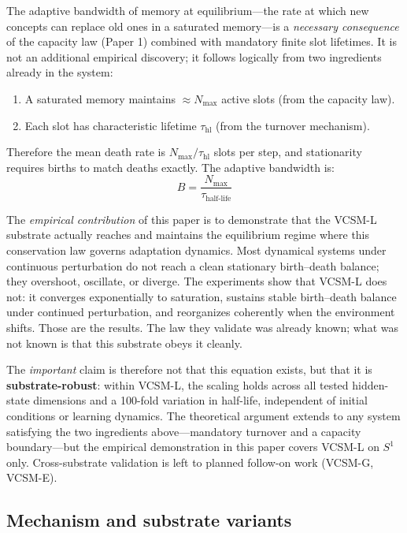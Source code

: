 \documentclass[11pt]{article}
\begin{document}
The adaptive bandwidth of memory at equilibrium---the rate at which new concepts can replace old ones in a saturated memory---is a \emph{necessary consequence} of the capacity law (Paper 1) combined with mandatory finite slot lifetimes. It is not an additional empirical discovery; it follows logically from two ingredients already in the system:
\begin{enumerate}
  \item A saturated memory maintains $\approx N_{\max}$ active slots (from the capacity law).
  \item Each slot has characteristic lifetime $\tau_{\text{hl}}$ (from the turnover mechanism).
\end{enumerate}

Therefore the mean death rate is $N_{\max}/\tau_{\text{hl}}$ slots per step, and stationarity requires births to match deaths exactly. The adaptive bandwidth is:
\[
  B = \frac{N_{\max}}{\tau_{\text{half-life}}}
\]

The \emph{empirical contribution} of this paper is to demonstrate that the VCSM-L substrate actually reaches and maintains the equilibrium regime where this conservation law governs adaptation dynamics. Most dynamical systems under continuous perturbation do not reach a clean stationary birth--death balance; they overshoot, oscillate, or diverge. The experiments show that VCSM-L does not: it converges exponentially to saturation, sustains stable birth--death balance under continued perturbation, and reorganizes coherently when the environment shifts. Those are the results. The law they validate was already known; what was not known is that this substrate obeys it cleanly.

The \emph{important} claim is therefore not that this equation exists, but that it is \textbf{substrate-robust}: within VCSM-L, the scaling holds across all tested hidden-state dimensions and a 100-fold variation in half-life, independent of initial conditions or learning dynamics. The theoretical argument extends to any system satisfying the two ingredients above---mandatory turnover and a capacity boundary---but the empirical demonstration in this paper covers VCSM-L on $S^1$ only. Cross-substrate validation is left to planned follow-on work (VCSM-G, VCSM-E).

\subsection{Mechanism and substrate variants}
\end{document}
